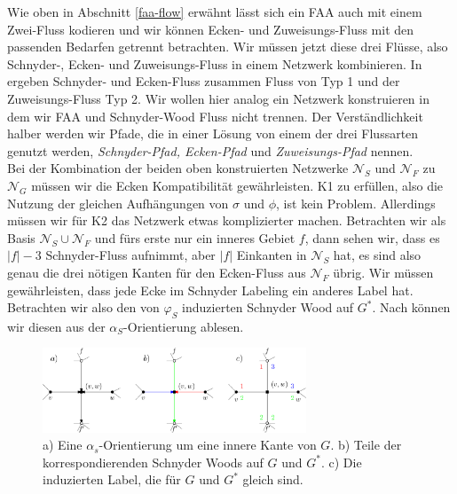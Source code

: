 Wie oben in Abschnitt \ref{faa-flow} erwähnt lässt sich ein FAA auch mit einem Zwei-Fluss kodieren und wir können Ecken- und Zuweisungs-Fluss mit den passenden Bedarfen getrennt betrachten. Wir müssen jetzt diese drei Flüsse, also Schnyder-, Ecken- und Zuweisungs-Fluss in einem Netzwerk kombinieren. In \cite{af15} ergeben Schnyder- und Ecken-Fluss zusammen Fluss von Typ 1 und der Zuweisungs-Fluss Typ 2. Wir wollen hier analog ein Netzwerk konstruieren in dem wir FAA und Schnyder-Wood Fluss nicht trennen. Der Verständlichkeit halber werden wir Pfade, die in einer Lösung von einem der drei Flussarten genutzt werden, \textit{Schnyder-Pfad, Ecken-Pfad} und \textit{Zuweisungs-Pfad} nennen.\\

Bei der Kombination der beiden oben konstruierten Netzwerke $\mathcal{N}_S$ und $\mathcal{N}_F$ zu $\mathcal{N}_G$ müssen wir die Ecken Kompatibilität gewährleisten. K1 zu erfüllen, also die Nutzung der gleichen Aufhängungen von $\sigma$ und $\phi$, ist kein Problem. Allerdings müssen wir für K2 das Netzwerk etwas komplizierter machen. Betrachten wir als Basis $\mathcal{N}_S \cup \mathcal{N}_F$ und fürs erste nur ein inneres Gebiet $f$, dann sehen wir, dass es $|f|-3$ Schnyder-Fluss aufnimmt, aber $|f|$ Einkanten in $\mathcal{N}_S$ hat, es sind also genau die drei nötigen Kanten für den Ecken-Fluss aus $\mathcal{N}_F$ übrig. Wir müssen gewährleisten, dass jede Ecke im Schnyder Labeling ein anderes Label hat. Betrachten wir also den von $\varphi_S$ induzierten Schnyder Wood auf $G^*$. Nach \cite{felsner12} können wir diesen aus der $\alpha_S$-Orientierung ablesen. 

\begin{figure}[h]
	\centering
  	\includegraphics[width=0.7\textwidth]{alpha_bij.png}
  	\caption{a) Eine $\alpha_s$-Orientierung um eine innere Kante von $G$. b) Teile der korrespondierenden Schnyder Woods auf $G$ und $G^*$. c) Die induzierten Label, die für $G$ und $G^*$ gleich sind.}
	\label{alpha_bij}
\end{figure}


